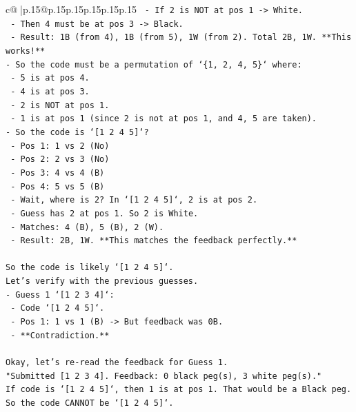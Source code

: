 \documentclass{article}
\begin{document}
{\begin{supertabular}{c@{$\;$}|p{.15\linewidth}@{}p{.15\linewidth}p{.15\linewidth}p{.15\linewidth}p{.15\linewidth}p{.15\linewidth}}
{{{\texttt{  {-} If 2 is NOT at pos 1 {-}> White.} \\
\texttt{  {-} Then 4 must be at pos 3 {-}> Black.} \\
\texttt{  {-} Result: 1B (from 4), 1B (from 5), 1W (from 2). Total 2B, 1W. **This works!**} \\
\texttt{{-} So the code must be a permutation of `\{1, 2, 4, 5\}` where:} \\
\texttt{  {-} 5 is at pos 4.} \\
\texttt{  {-} 4 is at pos 3.} \\
\texttt{  {-} 2 is NOT at pos 1.} \\
\texttt{  {-} 1 is at pos 1 (since 2 is not at pos 1, and 4, 5 are taken).} \\
\texttt{{-} So the code is `{[}1 2 4 5{]}`?} \\
\texttt{  {-} Pos 1: 1 vs 2 (No)} \\
\texttt{  {-} Pos 2: 2 vs 3 (No)} \\
\texttt{  {-} Pos 3: 4 vs 4 (B)} \\
\texttt{  {-} Pos 4: 5 vs 5 (B)} \\
\texttt{  {-} Wait, where is 2? In `{[}1 2 4 5{]}`, 2 is at pos 2.} \\
\texttt{  {-} Guess has 2 at pos 1. So 2 is White.} \\
\texttt{  {-} Matches: 4 (B), 5 (B), 2 (W).} \\
\texttt{  {-} Result: 2B, 1W. **This matches the feedback perfectly.**} \\
\\ 
\texttt{So the code is likely `{[}1 2 4 5{]}`.} \\
\texttt{Let's verify with the previous guesses.} \\
\texttt{{-} Guess 1 `{[}1 2 3 4{]}`:} \\
\texttt{  {-} Code `{[}1 2 4 5{]}`.} \\
\texttt{  {-} Pos 1: 1 vs 1 (B) {-}> But feedback was 0B.} \\
\texttt{  {-} **Contradiction.**} \\
\\ 
\texttt{Okay, let's re{-}read the feedback for Guess 1.} \\
\texttt{"Submitted {[}1 2 3 4{]}. Feedback: 0 black peg(s), 3 white peg(s)."} \\
\texttt{If code is `{[}1 2 4 5{]}`, then 1 is at pos 1. That would be a Black peg.} \\
\texttt{So the code CANNOT be `{[}1 2 4 5{]}`.} \\
}}}
\end{supertabular}}
\end{document}

